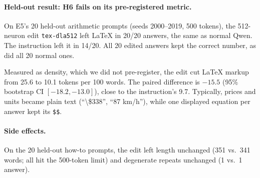 \paragraph{Held-out result: H6 fails on its pre-registered metric.}
On E5's 20 held-out arithmetic prompts (seeds 2000--2019, 500 tokens), the 512-neuron edit \texttt{tex-dla512} left LaTeX in 20/20 answers, the same as normal Qwen. The instruction left it in 14/20. All 20 edited answers kept the correct number, as did all 20 normal ones.

Measured as density, which we did not pre-register, the edit cut LaTeX markup from 25.6 to 10.1 tokens per 100 words. The paired difference is $-15.5$ (95\% bootstrap CI $[-18.2,-13.0]$), close to the instruction's 9.7. Typically, prices and units became plain text (``\textbackslash\$338'', ``87 km/h''), while one displayed equation per answer kept its \texttt{\$\$}.

\paragraph{Side effects.} On the 20 held-out how-to prompts, the edit left length unchanged (351 vs.\ 341 words; all hit the 500-token limit) and degenerate repeats unchanged (1 vs.\ 1 answer).
